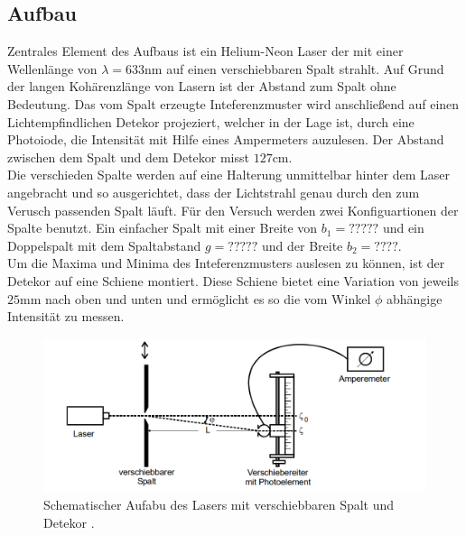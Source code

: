 \subsection{Aufbau}
Zentrales Element des Aufbaus ist ein Helium-Neon Laser der mit einer Wellenlänge von $\lambda = 633\si{\nano \meter}$ auf einen
verschiebbaren Spalt strahlt. Auf Grund der langen Kohärenzlänge von Lasern ist der Abstand zum Spalt ohne Bedeutung.
Das vom Spalt erzeugte Inteferenzmuster wird anschließend auf einen Lichtempfindlichen Detekor projeziert, 
welcher in der Lage ist, durch eine Photoiode, die Intensität mit Hilfe eines Ampermeters auzulesen. Der Abstand zwischen dem Spalt und 
dem Detekor misst $127\si{\cm}$. 
\\
\newline
Die verschieden Spalte werden auf eine Halterung unmittelbar hinter dem Laser angebracht und so ausgerichtet, dass der Lichtstrahl 
genau durch den zum Verusch passenden Spalt läuft. Für den Versuch werden zwei Konfiguartionen der Spalte benutzt. 
Ein einfacher Spalt mit einer Breite von $b_1=?????$ und ein Doppelspalt mit dem Spaltabstand $g=?????$ und der Breite $b_2=????$.
\\ 
\newline
Um die Maxima und Minima des Inteferenzmusters auslesen zu können, ist der Detekor auf eine Schiene montiert. 
Diese Schiene bietet eine Variation von jeweils $25 \si{\mm}$ nach oben und unten und ermöglicht es so die vom Winkel
$\phi$ abhängige Intensität zu messen.
\begin{figure}
    \centering
    \includegraphics[width=\textwidth]{bilder/aufbau.png}
    \caption{Schematischer Aufabu des Lasers mit verschiebbaren Spalt und Detekor \cite{skript}.} 
    \label{fig:abb1}
\end{figure}

